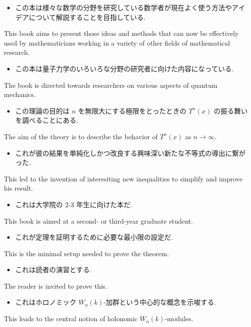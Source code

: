 \documentclass[openany, a4paper, oneside]{jsbook}
\begin{document}
\begin{itemize}
\item この本は様々な数学の分野を研究している数学者が現在よく使う方法やアイデアについて解説することを目指している. \cite{Magnetic}
\end{itemize}
This book aims to present those ideas and methods that can now be effectively used by mathematicians working in a variety of
other fields of mathematical research.

\begin{itemize}
\item この本は量子力学のいろいろな分野の研究者に向けた内容になっている. \cite{LiebSeiringer1}
\end{itemize}
The book is directed towards researchers on various aspects of quantum mechanics.

\begin{itemize}
\item この理論の目的は $n$ を無限大にする極限をとったときの $T^n(x)$ の振る舞いを調べることにある. \cite{OmriSarig1}
\end{itemize}
The aim of the theory is to describe the behavior of $T^n(x)$ as $n \to \infty$.

\begin{itemize}
\item これが彼の結果を単純化しかつ改良する興味深い新たな不等式の導出に繋がった. \cite{LiebSeiringer1}
\end{itemize}
This led to the invention of interesiting new inequalities to simplify and improve his result.

\begin{itemize}
\item これは大学院の 2-3 年生に向けた本だ. \cite{CharlesWeibel1}
\end{itemize}
This book is aimed at a second- or third-year graduate student.

\begin{itemize}
\item これが定理を証明するために必要な最小限の設定だ. \cite{OmriSarig1}
\end{itemize}
This is the minimal setup needed to prove the theorem.

\begin{itemize}
\item これは読者の演習とする. \cite{LiebSeiringer1}
\end{itemize}
The reader is invited to prove this.

\begin{itemize}
\item これはホロノミック $W_n(k)$-加群という中心的な概念を示唆する.
\end{itemize}
This leads to the central notion of holonomic $W_n(k)$-modules.
\end{document}
